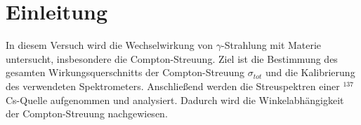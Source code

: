 \chapter{Einleitung}
In diesem Versuch wird die Wechselwirkung von $\gamma$-Strahlung mit Materie untersucht, insbesondere die Compton-Streuung. 
Ziel ist die Bestimmung des gesamten Wirkungsquerschnitts der Compton-Streuung $\sigma_{tot}$ und die Kalibrierung des verwendeten Spektrometers. 
Anschließend werden die Streuspektren einer $^{137}$Cs-Quelle aufgenommen und analysiert. 
Dadurch wird die Winkelabhängigkeit der Compton-Streuung nachgewiesen.